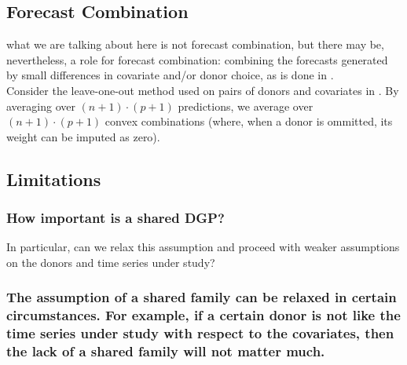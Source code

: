 \documentclass[11pt]{article}
\theoremstyle{definition}
\begin{document}
\subsection{Forecast Combination}
what we are talking about here is not forecast combination, but there may be, nevertheless, a role for forecast combination: combining the forecasts generated by small differences in covariate and/or donor choice, as is done in \cite{lundquist2024volatility}. \\

Consider the leave-one-out method used on pairs of donors and covariates in \cite{lundquist2024volatility}.  By averaging over $(n+1)\cdot (p+1)$ predictions, we average over $(n+1) \cdot (p + 1)$ convex combinations (where, when a donor is ommitted, its weight can be imputed as zero).

\subsection{Limitations}\label{Limitations}

\subsubsection{How important is a shared DGP?}
In particular, can we relax this assumption and proceed with weaker assumptions on the donors and time series under study?

\subsubsection{The assumption of a shared family can be relaxed in certain circumstances.  For example, if a certain donor is not like the time series under study with respect to the covariates, then the lack of a shared family will not matter much.}
\end{document}
